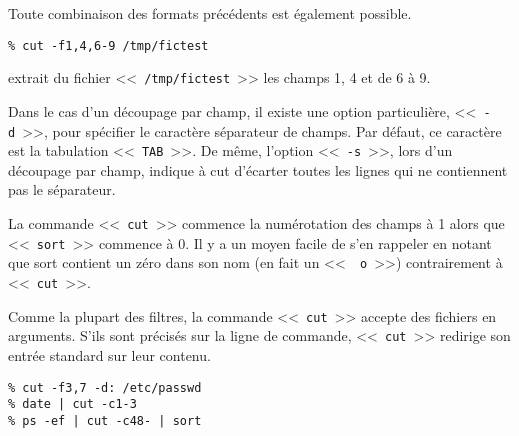 Toute combinaison des formats pr{\'e}c{\'e}dents est {\'e}galement possible.

\begin{example}
\begin{verbatim}
% cut -f1,4,6-9 /tmp/fictest
\end{verbatim}
extrait du fichier <<~{\tt /tmp/fictest}~>> les champs 1, 4 et de 6 {\`a} 9.
\end{example}

Dans le cas d'un d{\'e}coupage par champ, il existe une option particuli{\`e}re,
<<~{\tt -d}~>>, pour sp{\'e}cifier le caract{\`e}re s{\'e}parateur de champs. Par
d{\'e}faut, ce caract{\`e}re est la tabulation <<~{\tt TAB}~>>. De m{\^e}me,
l'option <<~{\tt -s}~>>, lors d'un d{\'e}coupage par champ, indique {\`a} cut
d'{\'e}carter toutes les lignes qui ne contiennent pas le s{\'e}parateur.

\begin{remarque}
La commande <<~{\tt cut}~>> commence la num{\'e}rotation des champs {\`a} 1 alors
que <<~{\tt sort}~>> commence {\`a} 0. Il y a un moyen facile de s'en rappeler
en notant que sort contient un z{\'e}ro dans son nom (en fait un <<~{\tt
o}~>>) contrairement {\`a} <<~{\tt cut}~>>.
\end{remarque}

Comme la plupart des filtres, la commande <<~{\tt cut}~>> accepte des
fichiers en arguments. S'ils sont pr{\'e}cis{\'e}s sur la ligne de commande,
<<~{\tt cut}~>> redirige son entr{\'e}e standard sur leur contenu.

\begin{example}
\begin{verbatim}
% cut -f3,7 -d: /etc/passwd
% date | cut -c1-3
% ps -ef | cut -c48- | sort
\end{verbatim}
\end{example}
